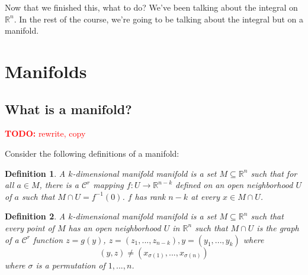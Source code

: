 \documentclass{article}
\newtheorem{definition}{Definition}
\newcommand{\reals}[0]{\mathbb{R}}
\newcommand{\mc}[1]{\mathcal{#1}}
\newcommand{\TODO}[1]{\textcolor{red}{\textbf{TODO:} #1}}
\begin{document}
Now that we finished this, what to do? We've been talking about the integral on \(\reals^n\). In the rest of the course, we're going to be talking about the integral but on a manifold.

\section{Manifolds}

\subsection{What is a manifold?}

\TODO{rewrite, copy}


Consider the following definitions of a manifold:
\begin{definition}
  A \(k\)-dimensional manifold manifold is a set \(M \subseteq \reals^n\) such that for all \(a \in M\), there is a \(\mc{C}^r\) mapping \(f: U \to \reals^{n - k}\) defined on an open neighborhood \(U\) of \(a\) such that \(M \cap U = f^{-1}(0)\). \(f\) has rank \(n - k\) at every \(x \in M \cap U\).
  \label{def:manifold1}
\end{definition}

\begin{definition}
  A \(k\)-dimensional manifold manifold is a set \(M \subseteq \reals^n\) such that every point of \(M\) has an open neighborhood \(U\) in \(\reals^n\) such that \(M \cap U\) is the graph of a \(\mc{C}^r\) function \(z = g(y)\), \(z = (z_1,...,z_{n - k}), y = (y_1,...,y_k)\) where
  \[(y, z) \neq (x_{\sigma(1)},...,x_{\sigma(n)})\]
  where \(\sigma\) is a permutation of \(1,...,n\).
  \label{def:manifold2}
\end{definition}
\end{document}
